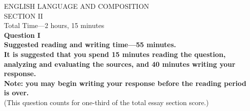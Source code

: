 \documentclass[12pt, letterpaper]{article}
\begin{document}
\begin{center}
    \vspace{10 mm}
    ENGLISH LANGUAGE AND COMPOSITION\\
    SECTION II\\
    Total Time—2 hours, 15 minutes\\
    \vspace{10 mm}
    \textbf{Question I}\\
    \vspace{5 mm}
    \textbf{Suggested reading and writing time—55 minutes.}\\
    \textbf{It is suggested that you spend 15 minutes reading the question, analyzing and evaluating the sources, and 40 minutes writing your response.}\\
    \textbf{Note: you may begin writing your response before the reading period is over.}\\
    \vspace{5 mm}
    (This question counts for one-third of the total essay section score.)\\
    \vspace{5 mm}
\end{center}
\end{document}
